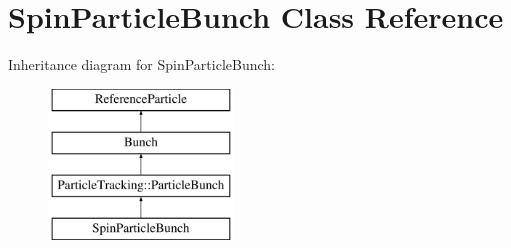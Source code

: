 \hypertarget{classSpinParticleBunch}{}\section{Spin\+Particle\+Bunch Class Reference}
\label{classSpinParticleBunch}
Inheritance diagram for Spin\+Particle\+Bunch\+:\begin{figure}[H]
\begin{center}
\leavevmode
\includegraphics[height=4.000000cm]{classSpinParticleBunch}
\end{center}
\end{figure}
